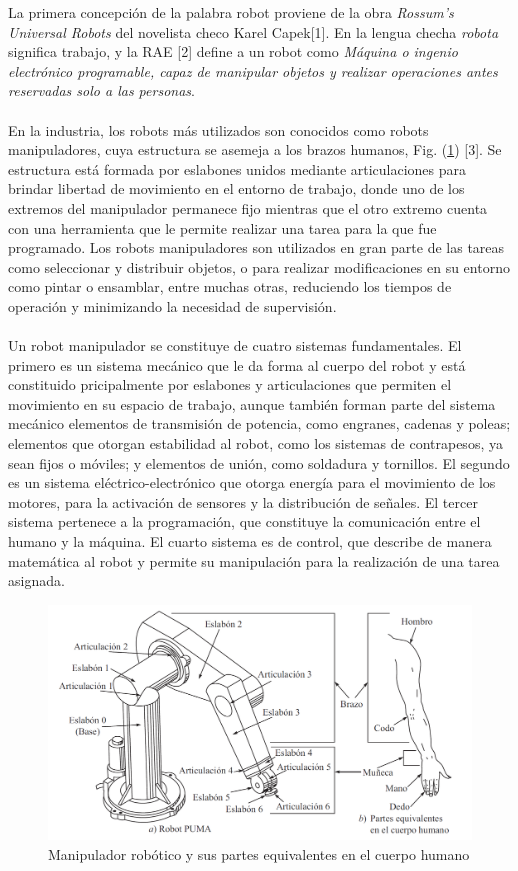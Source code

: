 \textcolor{Azul}La primera concepción de la palabra robot proviene de la obra \textit{Rossum's Universal Robots} del novelista checo Karel Capek[1]. En la lengua checha \textit{robota} significa trabajo, y la RAE [2] define a un robot como \textit{Máquina o ingenio electrónico programable, capaz de manipular objetos y realizar operaciones antes reservadas solo a las personas}. \\\\En la industria, los robots  más utilizados son conocidos como robots manipuladores, cuya estructura se asemeja a los brazos humanos, Fig. (\ref{estructurarobot}) [3]. Se estructura está formada por eslabones unidos mediante articulaciones para brindar libertad de movimiento en el entorno de trabajo, donde uno de los extremos del manipulador permanece fijo mientras que el otro extremo cuenta con una herramienta que le permite realizar una tarea para la que fue programado. Los robots manipuladores son utilizados en gran parte de las tareas como seleccionar y distribuir objetos, o para realizar modificaciones en su entorno como pintar o ensamblar, entre muchas otras, reduciendo los tiempos de operación y minimizando la necesidad de supervisión.\\\\Un robot manipulador se constituye de cuatro sistemas fundamentales. El primero es un sistema mecánico que le da forma al cuerpo del robot y está constituido pricipalmente por eslabones y articulaciones que permiten el movimiento en su espacio de trabajo, aunque también forman parte del sistema mecánico elementos de transmisión de potencia, como engranes, cadenas y poleas; elementos que otorgan estabilidad al robot, como los sistemas de contrapesos, ya sean fijos o móviles; y elementos de unión, como soldadura y tornillos. El segundo es un sistema eléctrico-electrónico que otorga energía para el movimiento de los motores, para la activación de sensores y la distribución de señales. El tercer sistema pertenece a la programación, que constituye la comunicación entre el humano y la máquina. El cuarto  sistema es de control, que describe de manera matemática al robot y permite su manipulación para la realización de una tarea asignada.

\begin{figure}
	\centering
	\includegraphics[scale=0.5]{Capitulo1/figs/EstructuraManipulador.png} 
	\caption{Manipulador robótico y sus partes equivalentes en el cuerpo humano}
	\label{estructurarobot}
\end{figure}



